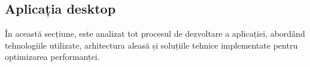     \subsection{Aplicația desktop}
    În această secțiune, este analizat tot procesul de dezvoltare a aplicației, abordând tehnologiile utilizate, arhitectura aleasă și soluțiile tehnice implementate pentru optimizarea performanței. 






